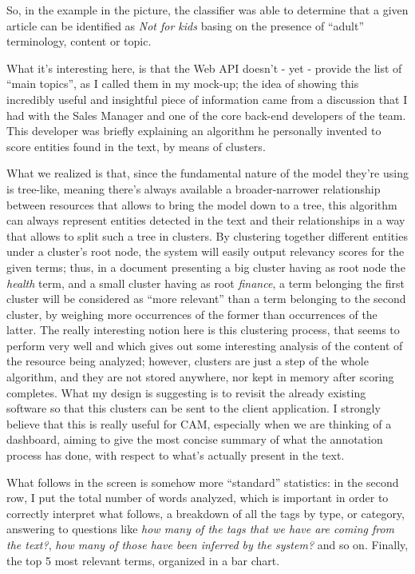 \documentclass[12pt,svgnames]{memoir}
\begin{document}
So, in the example in the picture, the classifier was able to determine
that a given article can be identified as \emph{Not for kids} basing on
the presence of ``adult'' terminology, content or topic.

What it's interesting here, is that the Web API doesn't - yet - provide
the list of ``main topics'', as I called them in my mock-up; the idea of
showing this incredibly useful and insightful piece of information came
from a discussion that I had with the Sales Manager and one of the core
back-end developers of the team. This developer was briefly explaining
an algorithm he personally invented to score entities found in the text,
by means of clusters.

What we realized is that, since the fundamental nature of the model
they're using is tree-like, meaning there's always available a
broader-narrower relationship between resources that allows to bring the
model down to a tree, this algorithm can always represent entities
detected in the text and their relationships in a way that allows to
split such a tree in clusters. By clustering together different entities
under a cluster's root node, the system will easily output relevancy
scores for the given terms; thus, in a document presenting a big cluster
having as root node the \emph{health} term, and a small cluster having
as root \emph{finance}, a term belonging the first cluster will be
considered as ``more relevant'' than a term belonging to the second
cluster, by weighing more occurrences of the former than occurrences of
the latter. The really interesting notion here is this clustering
process, that seems to perform very well and which gives out some
interesting analysis of the content of the resource being analyzed;
however, clusters are just a step of the whole algorithm, and they are
not stored anywhere, nor kept in memory after scoring completes. What my
design is suggesting is to revisit the already existing software so that
this clusters can be sent to the client application. I strongly believe
that this is really useful for CAM, especially when we are thinking of a
dashboard, aiming to give the most concise summary of what the
annotation process has done, with respect to what's actually present in
the text. \parskip0pt

What follows in the screen is somehow more ``standard'' statistics: in
the second row, I put the total number of words analyzed, which is
important in order to correctly interpret what follows, a breakdown of
all the tags by type, or category, answering to questions like \emph{how
many of the tags that we have are coming from the text?}, \emph{how many
of those have been inferred by the system?} and so on. Finally, the top
5 most relevant terms, organized in a bar chart.
\end{document}
